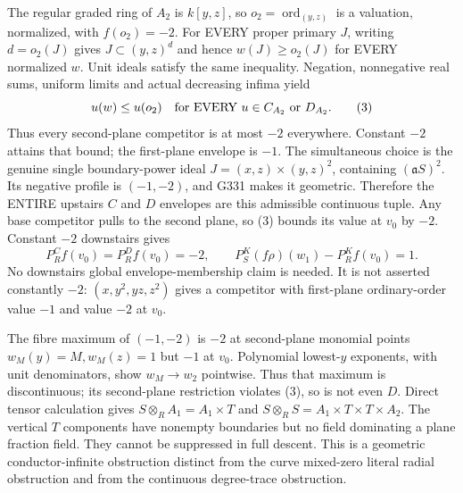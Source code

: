 The regular graded ring of $A_2$ is $k[y,z]$, so $o_2=\operatorname{ord}_{(y,z)}$ is a valuation, normalized, with $f(o_2)=-2$. For EVERY proper primary $J$, writing $d=o_2(J)$ gives $J\subset(y,z)^d$ and hence $w(J)\ge o_2(J)$ for EVERY normalized $w$. Unit ideals satisfy the same inequality. Negation, nonnegative real sums, uniform limits and actual decreasing infima yield
\[
 u(w)\le u(o_2)\quad\hbox{for EVERY }u\in C_{A_2}\text{ or }D_{A_2}. \tag{3}
\]
Thus every second-plane competitor is at most $-2$ everywhere. Constant $-2$ attains that bound; the first-plane envelope is $-1$. The simultaneous choice is the genuine single boundary-power ideal
$J=(x,z)\times(y,z)^2$, containing $(\mathfrak aS)^2$. Its negative profile is $(-1,-2)$, and G331 makes it geometric. Therefore the ENTIRE upstairs $C$ and $D$ envelopes are this admissible continuous tuple. Any base competitor pulls to the second plane, so (3) bounds its value at $v_0$ by $-2$. Constant $-2$ downstairs gives
\[
 P_R^Cf(v_0)=P_R^Df(v_0)=-2,\qquad
 P_S^K(f\rho)(w_1)-P_R^Kf(v_0)=1. \tag{4}
\]
No downstairs global envelope-membership claim is needed. It is not asserted constantly $-2$: $(x,y^2,yz,z^2)$ gives a competitor with first-plane ordinary-order value $-1$ and value $-2$ at $v_0$.

The fibre maximum of $(-1,-2)$ is $-2$ at second-plane monomial points $w_M(y)=M,w_M(z)=1$ but $-1$ at $v_0$. Polynomial lowest-$y$ exponents, with unit denominators, show $w_M\to w_2$ pointwise. Thus that maximum is discontinuous; its second-plane restriction violates (3), so is not even $D$. Direct tensor calculation gives
$S\otimes_R A_1=A_1\times T$ and $S\otimes_R S=A_1\times T\times T\times A_2$. The vertical $T$ components have nonempty boundaries but no field dominating a plane fraction field. They cannot be suppressed in full descent. This is a geometric conductor-infinite obstruction distinct from the curve mixed-zero literal radial obstruction and from the continuous degree-trace obstruction.
